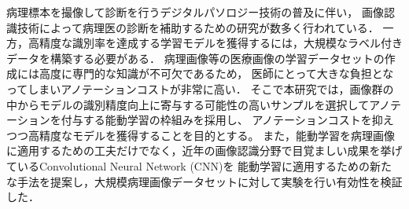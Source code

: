 病理標本を撮像して診断を行うデジタルパソロジー技術の普及に伴い，
画像認識技術によって病理医の診断を補助するための研究が数多く行われている．
一方，高精度な識別率を達成する学習モデルを獲得するには，大規模なラベル付きデータを構築する必要がある．
病理画像等の医療画像の学習データセットの作成には高度に専門的な知識が不可欠であるため，
医師にとって大きな負担となってしまいアノテーションコストが非常に高い．
そこで本研究では，画像群の中からモデルの識別精度向上に寄与する可能性の高いサンプルを選択してアノテーションを付与する能動学習の枠組みを採用し、
アノテーションコストを抑えつつ高精度なモデルを獲得することを目的とする。
また，能動学習を病理画像に適用するための工夫だけでなく，近年の画像認識分野で目覚ましい成果を挙げているConvolutional Neural Network (CNN)を
能動学習に適用するための新たな手法を提案し，大規模病理画像データセットに対して実験を行い有効性を検証した．
